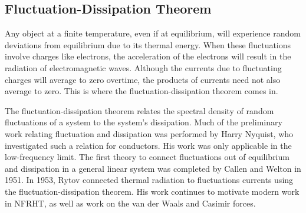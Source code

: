 \subsection{Fluctuation-Dissipation Theorem}
%
Any object at a finite temperature, even if at equilibrium, will experience random deviations from equilibrium due to its thermal energy. When these fluctuations involve charges like electrons, the acceleration of the electrons will result in the radiation of electromagnetic waves. Although the currents due to fluctuating charges will average to zero overtime, the products of currents need not also average to zero. This is where the fluctuation-dissipation theorem comes in.

The fluctuation-dissipation theorem relates the spectral density of random fluctuations of a system to the system's dissipation. Much of the preliminary work relating fluctuation and dissipation was performed by Harry Nyquist, who investigated such a relation for conductors.\cite{Nyquist1928} His work was only applicable in the low-frequency limit. The first theory to connect fluctuations out of equilibrium and dissipation in a general linear system was completed by Callen and Welton in 1951.\cite{Callen1951} In 1953, Rytov connected thermal radiation to fluctuations currents using the fluctuation-dissipation theorem.\cite{Rytov1953, Rytov1959} His work continues to motivate modern work in NFRHT, as well as work on the van der Waals and Casimir forces.\cite{Lipshitz1956, Dzyaloshinskii1961}

